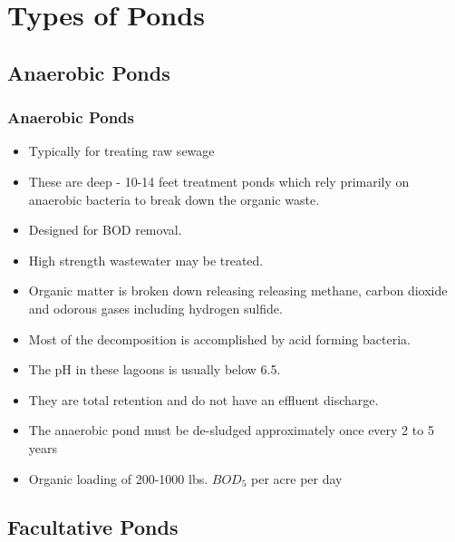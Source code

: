 \section{Types of Ponds}	

\subsection{Anaerobic Ponds}	

\subsubsection{Anaerobic Ponds}	

\begin{itemize}	
\item Typically for treating raw sewage
\item These are deep - 10-14 feet treatment ponds which rely primarily on anaerobic bacteria to break down the organic waste.
\item Designed for BOD removal.
\item High strength wastewater may be treated.
\item Organic matter is broken down releasing releasing methane, carbon dioxide and odorous gases including hydrogen sulfide. 
\item Most of the decomposition is accomplished by acid forming bacteria. 
\item The pH in these lagoons is usually below 6.5. 
\item They are total retention and do not have an effluent discharge. 
\item The anaerobic pond must be de-sludged approximately once every 2 to 5 years
\item Organic loading of 200-1000 lbs. $BOD_5$ per acre per day
\end{itemize}

\subsection{Facultative Ponds}	

